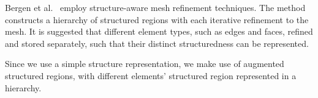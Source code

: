 
Bergen et al.~\cite{bergen2004hierarchical} employ structure-aware mesh refinement techniques. The method constructs a hierarchy of structured regions with each iterative refinement to the mesh. It is suggested that different element types, such as edges and faces, refined and stored separately, such that their distinct structuredness can be represented.

Since we use a simple structure representation, we make use of augmented structured regions, with different elements' structured region represented in a hierarchy.




















